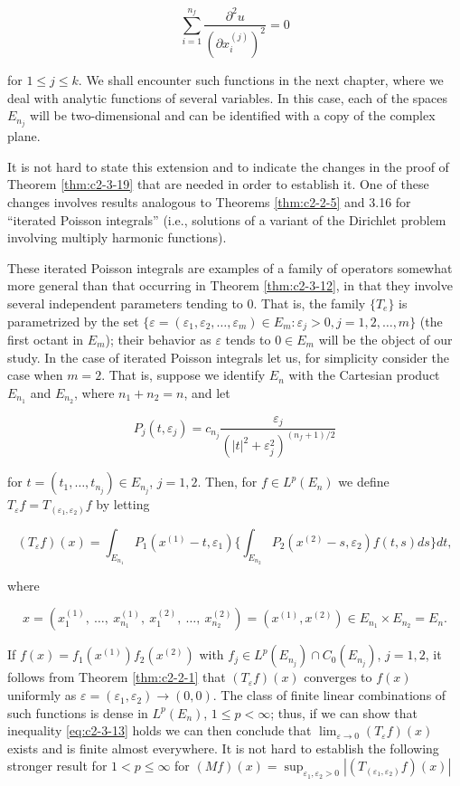 \[
\sum_{i=1}^{n_{f}}\frac{\partial^{2}u}{(\partial x_{i}^{(j)})^{2}}=0
\]

for $1 \leq j \leq k$. We shall encounter such functions in the next chapter, where we deal with analytic functions of several variables. In this case, each of the spaces $E_{n_j}$ will be two-dimensional and can be identified with a copy of the complex plane.

It is not hard to state this extension and to indicate the changes in the proof of Theorem \ref{thm:c2-3-19} that are needed in order to establish it. One of these changes involves results analogous to Theorems \ref{thm:c2-2-5} and 3.16 for ``iterated Poisson integrals'' (i.e., solutions of a variant of the Dirichlet problem involving multiply harmonic functions).

These iterated Poisson integrals are examples of a family of operators somewhat more general than that occurring in Theorem \ref{thm:c2-3-12}, in that they involve several independent parameters tending to 0. That is, the family $\{T_e\}$ is parametrized by the set $\{\varepsilon = (\varepsilon_1, \varepsilon_2, \ldots, \varepsilon_m) \in E_m \colon \varepsilon_j > 0, j = 1, 2, \ldots, m\}$ (the first octant in $E_m$); their behavior as $\varepsilon$ tends to $0 \in E_m$ will be the object of our study. In the case of iterated Poisson integrals let us, for simplicity consider the case when $m = 2$. That is, suppose we identify $E_n$ with the Cartesian product $E_{n_1}$ and $E_{n_2}$, where $n_1 + n_2 = n$, and let

\[
P_{j}(t,\varepsilon_{j})=c_{n_{j}}\frac{\varepsilon_{j}}{(|t|^{2}+\varepsilon_{j}^{2})^{(n_{f}+1)/2}}
\]

for $t = (t_1, \ldots, t_{n_j}) \in E_{n_j}$, $j = 1, 2$. Then, for $f \in L^p(E_n)$ we define $T_\varepsilon f = T_{(\varepsilon_1, \varepsilon_2)} f$ by letting

\[
(T_{\varepsilon}f)(x)=\int_{E_{n_{1}}}P_{1}(x^{(1)}-t,\varepsilon_{1})\Biggl\{\int_{E_{n_{2}}}P_{2}(x^{(2)}-s,\varepsilon_{2})f(t,s)d s\Biggr\}d t,
\]

where

\[
x=\left(x_{1}^{(1)},\ \ldots,\ x_{n_{1}}^{(1)},\ x_{1}^{(2)},\ \ldots,\ x_{n_{2}}^{(2)}\right)=\left(x^{(1)},x^{(2)}\right)\in E_{n_{1}}\times E_{n_{2}}=E_{n}.
\]

If $f(x) = f_1(x^{(1)})f_2(x^{(2)})$ with $f_j \in L^p(E_{n_j}) \cap C_0(E_{n_j})$, $j = 1, 2$, it follows from Theorem \ref{thm:c2-2-1} that $(T_{\varepsilon}f)(x)$ converges to $f(x)$ uniformly as $\varepsilon = (\varepsilon_1, \varepsilon_2) \to (0, 0)$. The class of finite linear combinations of such functions is dense in $L^p(E_n)$, $1 \leq p < \infty$; thus, if we can show that inequality \eqref{eq:c2-3-13} holds we can then conclude that $\lim_{\varepsilon \to 0} (T_{\varepsilon}f)(x)$ exists and is finite almost everywhere. It is not hard to establish the following stronger result for $1 < p \leq \infty$ for $(Mf)(x) = \sup_{\varepsilon_1, \varepsilon_2 > 0} |(T_{(\varepsilon_1, \varepsilon_2)} f)(x)|$

